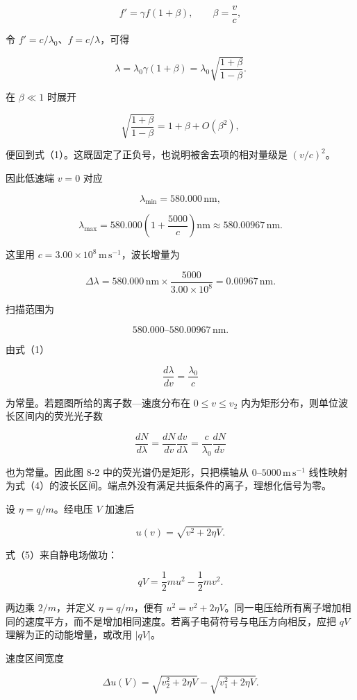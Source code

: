 \documentclass[12pt,a4paper,UTF8]{ctexart}
\begin{document}
\[
f'=\gamma f(1+\beta),
\qquad
\beta=\frac vc,
\]

令 \(f'=c/\lambda_0\)、\(f=c/\lambda\)，可得

\[
\lambda
=\lambda_0\gamma(1+\beta)
=\lambda_0\sqrt{\frac{1+\beta}{1-\beta}}.
\]

在 \(\beta\ll1\) 时展开

\[
\sqrt{\frac{1+\beta}{1-\beta}}
=1+\beta+O(\beta^2),
\]

便回到式（1）。这既固定了正负号，也说明被舍去项的相对量级是
\((v/c)^2\)。

因此低速端 \(v=0\) 对应

\[
\lambda_{\min}=580.000\,\mathrm{nm},
\tag{2}
\]

\[
\lambda_{\max}
=580.000\left(1+\frac{5000}{c}\right)\mathrm{nm}
\approx580.00967\,\mathrm{nm}.
\tag{3}
\]

这里用 \(c=3.00\times10^8\,\mathrm{m\,s^{-1}}\)，波长增量为

\[
\Delta\lambda
=580.000\,\mathrm{nm}\times\frac{5000}{3.00\times10^8}
=0.00967\,\mathrm{nm}.
\]

扫描范围为

\[
\boxed{580.000\text{--}580.00967\,\mathrm{nm}}.
\tag{4}
\]

由式（1）

\[
\frac{d\lambda}{dv}=\frac{\lambda_0}{c}
\]

为常量。若题图所给的离子数---速度分布在 \(0\le v\le v_2\)
内为矩形分布，则单位波长区间内的荧光光子数

\[
\frac{dN}{d\lambda}
=\frac{dN}{dv}\frac{dv}{d\lambda}
=\frac{c}{\lambda_0}\frac{dN}{dv}
\]

也为常量。因此图 8-2 中的荧光谱仍是矩形，只把横轴从
\(0\text{--}5000\,\mathrm{m\,s^{-1}}\)
线性映射为式（4）的波长区间。端点外没有满足共振条件的离子，理想化信号为零。

设 \(\eta=q/m\)。经电压 \(V\) 加速后

\[
u(v)=\sqrt{v^2+2\eta V}.
\tag{5}
\]

式（5）来自静电场做功：

\[
qV=\frac12mu^2-\frac12mv^2.
\]

两边乘 \(2/m\)，并定义 \(\eta=q/m\)，便有
\(u^2=v^2+2\eta V\)。同一电压给所有离子增加相同的速度平方，而不是增加相同速度。若离子电荷符号与电压方向相反，应把
\(qV\) 理解为正的动能增量，或改用 \(|qV|\)。

速度区间宽度

\[
\boxed{
\Delta u(V)
=\sqrt{v_2^2+2\eta V}
-\sqrt{v_1^2+2\eta V}
}.
\tag{6}
\]
\end{document}
